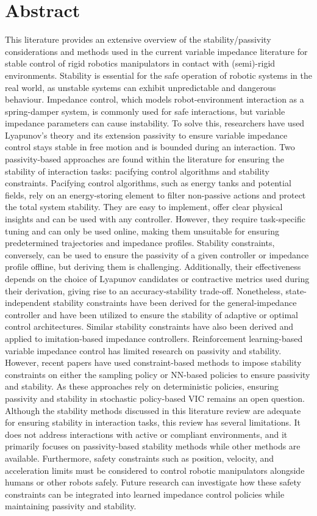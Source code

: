 \chapter*{Abstract}

This literature provides an extensive overview of the stability/passivity considerations and methods used in the current variable impedance literature for stable control of rigid robotics manipulators in contact with (semi)-rigid environments. Stability is essential for the safe operation of robotic systems in the real world, as unstable systems can exhibit unpredictable and dangerous behaviour. Impedance control, which models robot-environment interaction as a spring-damper system, is commonly used for safe interactions, but variable impedance parameters can cause instability. To solve this, researchers have used Lyapunov's theory and its extension passivity to ensure variable impedance control stays stable in free motion and is bounded during an interaction. Two passivity-based approaches are found within the literature for ensuring the stability of interaction tasks: pacifying control algorithms and stability constraints. Pacifying control algorithms, such as energy tanks and potential fields, rely on an energy-storing element to filter non-passive actions and protect the total system stability. They are easy to implement, offer clear physical insights and can be used with any controller. However, they require task-specific tuning and can only be used online, making them unsuitable for ensuring predetermined trajectories and impedance profiles. Stability constraints, conversely, can be used to ensure the passivity of a given controller or impedance profile offline, but deriving them is challenging. Additionally, their effectiveness depends on the choice of Lyapunov candidates or contractive metrics used during their derivation, giving rise to an accuracy-stability trade-off. Nonetheless, state-independent stability constraints have been derived for the general-impedance controller and have been utilized to ensure the stability of adaptive or optimal control architectures. Similar stability constraints have also been derived and applied to imitation-based impedance controllers. Reinforcement learning-based variable impedance control has limited research on passivity and stability. However, recent papers have used constraint-based methods to impose stability constraints on either the sampling policy or NN-based policies to ensure passivity and stability. As these approaches rely on deterministic policies, ensuring passivity and stability in stochastic policy-based VIC remains an open question. Although the stability methods discussed in this literature review are adequate for ensuring stability in interaction tasks, this review has several limitations. It does not address interactions with active or compliant environments, and it primarily focuses on passivity-based stability methods while other methods are available. Furthermore, safety constraints such as position, velocity, and acceleration limits must be considered to control robotic manipulators alongside humans or other robots safely. Future research can investigate how these safety constraints can be integrated into learned impedance control policies while maintaining passivity and stability.
